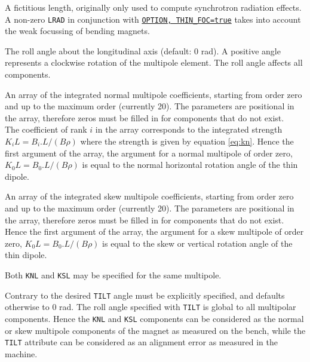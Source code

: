 \begin{madlist}
     A fictitious length, originally only used to
      compute synchrotron radiation effects. \\
      A non-zero {\tt LRAD} in conjunction with
	\hyperref[sec:option]{\tt OPTION, THIN\_FOC=true}
      takes into account the
      weak focussing of bending magnets.
      
     The roll angle about the longitudinal axis (default: 0
      rad). A positive angle represents a clockwise rotation of the
      multipole element. The roll angle affects all components.
      
     An array of the integrated normal multipole coefficients, 
      starting from order zero and up to the maximum order (currently 20). 
      The parameters are positional in the array, therefore 
      zeros must be filled in for components that do not exist. \\
      The coefficient of rank $i$ in the array corresponds to the integrated 
      strength $K_i L = B_i . L / (B\rho)$ where the strength is given by 
      equation \ref{eq:kn}. 
      Hence the first argument of the array, the argument for a normal
      multipole of order zero, $K_0 L = B_0 . L / (B\rho)$ is equal to
      the normal horizontal rotation angle of the thin dipole.
      
     An array of the integrated skew multipole coefficients, 
     starting from order zero and up to the maximum order (currently 20). The
     parameters are positional in the array, therefore zeros must be
     filled in for components that do not exist. 
     Hence the first argument of the array, the argument for a skew
     multipole of order zero, $K_0 L = B_0 . L / (B\rho)$ is equal to
     the skew or vertical rotation angle of the thin dipole.
 
\end{madlist}

Both {\tt KNL} and {\tt KSL} may be specified for the same multipole. 

Contrary to \madeight the desired {\tt TILT} angle must be explicitly
specified, and defaults otherwise to 0 rad. The roll angle specified
with {\tt TILT} is global to all multipolar components.  
Hence the {\tt KNL} and {\tt KSL} components can be considered as the
normal or skew multipole components of the magnet as measured on the
bench, while the {\tt TILT} attribute can be considered as an alignment
error as measured in the machine.

